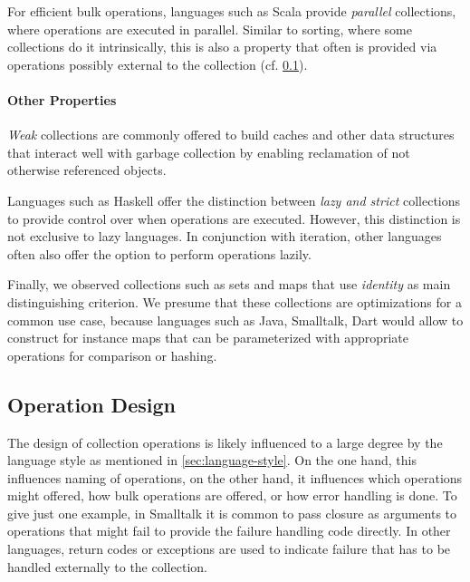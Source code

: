 \documentclass[sigconf, 10pt]{acmart}
\begin{document}
For efficient bulk operations,
languages such as Scala provide \emph{parallel} collections,
where operations are executed in parallel.
Similar to sorting, where some collections do it intrinsically,
this is also a property that often is provided via operations
possibly external to the collection (cf. \cref{sec:operations}).

\paragraph{Other Properties}

\emph{Weak} collections are commonly offered to build caches
and other data structures that interact well with garbage collection
by enabling reclamation of not otherwise referenced objects.

Languages such as Haskell offer the distinction between \emph{lazy and strict}
collections to provide control over when operations are executed.
However, this distinction is not exclusive to lazy languages.
In conjunction with iteration,
other languages often also offer the option to perform operations lazily.


Finally, we observed collections such as sets and maps
that use \emph{identity} as main distinguishing criterion.
We presume that these collections are optimizations for a common use case,
because languages such as Java, Smalltalk, Dart would allow to construct
for instance maps that can be parameterized with appropriate operations
for comparison or hashing.

\subsection{Operation Design}
\label{sec:operations}

The design of collection operations is likely influenced to a large degree
by the language style as mentioned in \cref{sec:language-style}.
On the one hand, this influences naming of operations,
on the other hand, it influences which operations might offered,
how bulk operations are offered, or how error handling is done.
To give just one example, in Smalltalk it is common to pass closure as arguments
to operations that might fail to provide the failure handling code directly.
In other languages, return codes or exceptions are used to indicate failure
that has to be handled externally to the collection.
\end{document}
